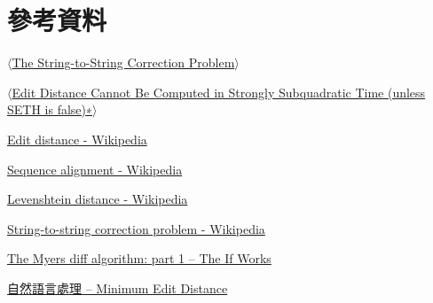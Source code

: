 \documentclass[15pt]{extarticle}
\begin{document}
\section{參考資料}
\begin{enumerate}[label={[\arabic*]}, noitemsep]
    \item \href{http://citeseerx.ist.psu.edu/viewdoc/download?doi=10.1.1.367.5281&rep=rep1&type=pdf}{$\langle$The String-to-String Correction Problem$\rangle$}
    \item \href{https://arxiv.org/pdf/1412.0348.pdf}{$\langle$Edit Distance Cannot Be Computed in Strongly Subquadratic Time
(unless SETH is false)∗$\rangle$}
    \item \href{https://en.wikipedia.org/wiki/Edit_distance}{Edit distance - Wikipedia}
    \item \href{https://en.wikipedia.org/wiki/Sequence_alignment}{Sequence alignment - Wikipedia} 
    \item \href{https://en.wikipedia.org/wiki/Levenshtein_distance}{Levenshtein distance - Wikipedia}
    \item \href{https://en.wikipedia.org/wiki/String-to-string_correction_problem}{String-to-string correction problem - Wikipedia}
    \item \href{https://blog.jcoglan.com/2017/02/12/the-myers-diff-algorithm-part-1/}{The Myers diff algorithm: part 1 – The If Works}
    \item \href{http://cpmarkchang.logdown.com/posts/222651-minimum-edit-distance}{自然語言處理 -- Minimum Edit Distance}
    
    
\end{enumerate}
\end{document}
